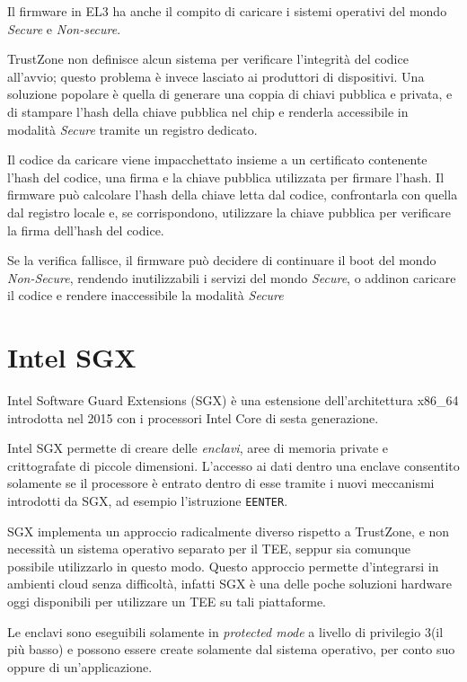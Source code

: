 \documentclass[12pt,italian]{report}
\begin{document}
\medbreak \noindent

Il firmware in EL3 ha anche il compito di caricare i sistemi operativi
del mondo \emph{Secure} e \emph{Non-secure}.

TrustZone non definisce alcun sistema per verificare l'integrità del codice
all'avvio; questo problema è invece lasciato ai produttori di dispositivi.
Una soluzione popolare è quella di generare una coppia di chiavi pubblica
e privata, e di stampare l'hash della chiave pubblica nel chip e renderla
accessibile in modalità \emph{Secure} tramite un registro dedicato.

Il codice da caricare viene impacchettato insieme a un certificato
contenente l'hash del codice, una firma e la chiave pubblica utilizzata
per firmare l'hash.
Il firmware può calcolare l'hash della chiave letta dal codice, confrontarla
con quella dal registro locale e, se corrispondono, utilizzare la
chiave pubblica per verificare la firma dell'hash del codice.

Se la verifica fallisce, il firmware può decidere di continuare il boot
del mondo \emph{Non-Secure}, rendendo inutilizzabili i servizi del mondo
\emph{Secure}, o addinon caricare il codice
e rendere inaccessibile la modalità \emph{Secure}

\section{Intel SGX}
\label{sec:intel-sgx}
Intel Software Guard Extensions (SGX) è una estensione
dell'architettura x86\_64 introdotta nel 2015 con i processori
Intel Core di sesta generazione.

Intel SGX permette di creare delle \textit{enclavi}, aree di
memoria private e crittografate di piccole dimensioni.
L'accesso ai dati dentro una enclave consentito solamente se
il processore è entrato dentro di esse tramite i nuovi meccanismi
introdotti da SGX, ad esempio l'istruzione \texttt{EENTER}.

SGX implementa un approccio radicalmente diverso rispetto a TrustZone, e
non necessità un sistema operativo separato per il TEE, seppur sia comunque
possibile utilizzarlo in questo modo.
Questo approccio permette d'integrarsi in ambienti cloud senza difficoltà,
infatti SGX è una delle poche soluzioni hardware oggi disponibili
per utilizzare un TEE su tali piattaforme.

Le enclavi sono eseguibili solamente in \textit{protected mode}
a livello di privilegio $3$(il più basso) e possono essere create
solamente dal sistema operativo, per conto suo oppure di un'applicazione.
\end{document}
